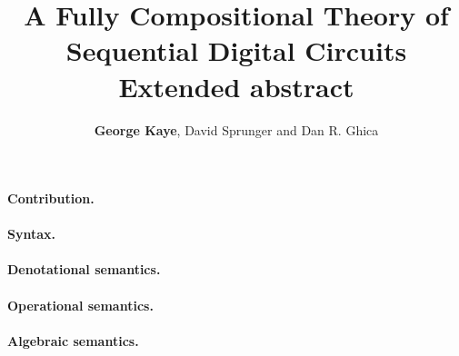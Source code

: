 \documentclass[10pt]{article}
\title{
    \vspace{-3em}
    A Fully Compositional Theory of Sequential Digital Circuits
    \\
    \textbf{Extended abstract}
}
\author{\textbf{George Kaye}, David Sprunger and Dan R. Ghica}
\date{}
\begin{document}
    \maketitle

    \paragraph*{Contribution.}

    \paragraph*{Syntax.}

    \paragraph*{Denotational semantics.}

    \paragraph*{Operational semantics.}

    \paragraph*{Algebraic semantics.}

    \printbibliography[heading=bibintoc,title={References}]
\end{document}
